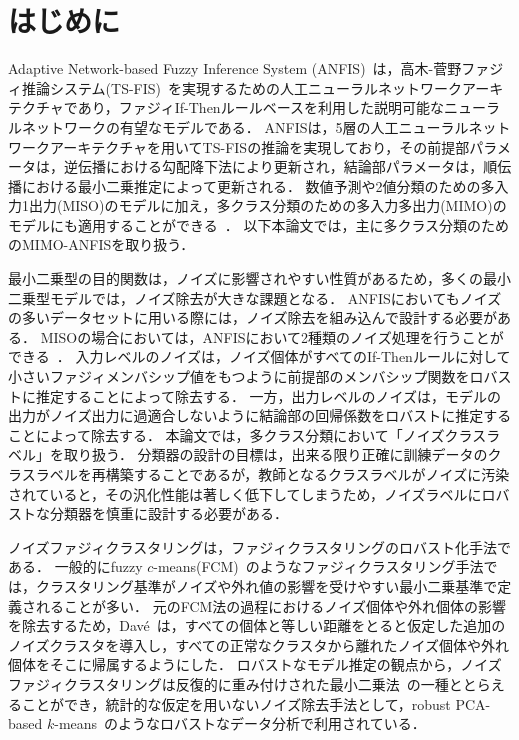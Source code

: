 \documentclass[fleqn]{ujarticle}
\begin{document}
\section{はじめに}
Adaptive Network-based Fuzzy Inference System (ANFIS)~\cite{Jang1993}は，高木-菅野ファジィ推論システム(TS-FIS)~\cite{Takagi1985}を実現するための人工ニューラルネットワークアーキテクチャであり，ファジィIf-Thenルールベースを利用した説明可能なニューラルネットワークの有望なモデルである．
ANFISは，5層の人工ニューラルネットワークアーキテクチャを用いてTS-FISの推論を実現しており，その前提部パラメータは，逆伝播における勾配降下法により更新され，結論部パラメータは，順伝播における最小二乗推定によって更新される．
数値予測や2値分類のための多入力1出力(MISO)のモデルに加え，多クラス分類のための多入力多出力(MIMO)のモデルにも適用することができる~\cite{Angelov2004}．
以下本論文では，主に多クラス分類のためのMIMO-ANFISを取り扱う．

最小二乗型の目的関数は，ノイズに影響されやすい性質があるため，多くの最小二乗型モデルでは，ノイズ除去が大きな課題となる．
ANFISにおいてもノイズの多いデータセットに用いる際には，ノイズ除去を組み込んで設計する必要がある．
MISOの場合においては，ANFISにおいて2種類のノイズ処理を行うことができる~\cite{Honda_ICIEV2021}．
入力レベルのノイズは，ノイズ個体がすべてのIf-Thenルールに対して小さいファジィメンバシップ値をもつように前提部のメンバシップ関数をロバストに推定することによって除去する．
一方，出力レベルのノイズは，モデルの出力がノイズ出力に過適合しないように結論部の回帰係数をロバストに推定することによって除去する．
本論文では，多クラス分類において「ノイズクラスラベル」を取り扱う．
分類器の設計の目標は，出来る限り正確に訓練データのクラスラベルを再構築することであるが，教師となるクラスラベルがノイズに汚染されていると，その汎化性能は著しく低下してしまうため，ノイズラベルにロバストな分類器を慎重に設計する必要がある．

ノイズファジィクラスタリングは，ファジィクラスタリングのロバスト化手法である．
一般的にfuzzy $c$-means(FCM)~\cite{Bezdek81a,Miyamoto_book08}のようなファジィクラスタリング手法では，クラスタリング基準がノイズや外れ値の影響を受けやすい最小二乗基準で定義されることが多い．
元のFCM法の過程におけるノイズ個体や外れ個体の影響を除去するため，Davé~\cite{Dave91,Dave97}は，すべての個体と等しい距離をとると仮定した追加のノイズクラスタを導入し，すべての正常なクラスタから離れたノイズ個体や外れ個体をそこに帰属するようにした．
ロバストなモデル推定の観点から，ノイズファジィクラスタリングは反復的に重み付けされた最小二乗法~\cite{Holland77}の一種ととらえることができ，統計的な仮定を用いないノイズ除去手法として，robust PCA-based $k$-means~\cite{Honda2010_IEEE-TFS}のようなロバストなデータ分析で利用されている．
\end{document}
